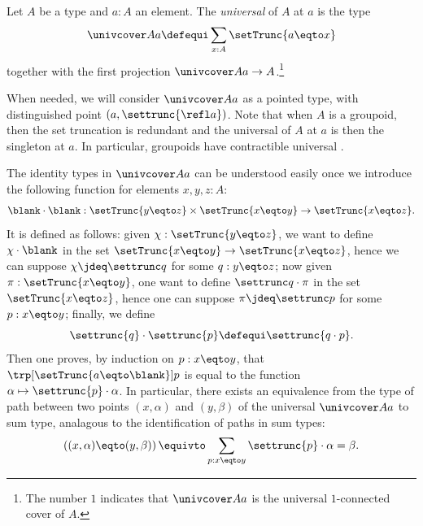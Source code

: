 \begin{definition}
  Let $A$ be a type and $a:A$ an element. The {\em universal \covering} of $A$ at
  $a$ is the type
  \begin{displaymath}
    \univcover A a \defequi \sum_{x:A}\setTrunc{a\eqto x}
  \end{displaymath}
  together with the first projection $\univcover A a \to A$.\footnote{%
    The number $1$ indicates that $\univcover A a$ is the universal
    $1$-connected cover of $A$.}
\end{definition}
When needed, we will consider $\univcover A a$ as a pointed type, with
distinguished point $(a,\settrunc{\refl a})$. Note that when $A$ is a
groupoid, then the set truncation is redundant and the universal \covering
of $A$ at $a$ is then the singleton at $a$. In particular, groupoids
have contractible universal \coverings.

The identity types in $\univcover A a$ can be understood easily once
we introduce the following function for elements $x,y,z:A$:
\begin{displaymath}
  \blank\cdot\blank : \setTrunc{y\eqto z} \times \setTrunc{x\eqto y} \to \setTrunc{x\eqto z}.
\end{displaymath}
It is defined as follows: given $\chi : \setTrunc{y\eqto z}$, we want to define
$\chi\cdot\blank$ in the set $\setTrunc{x\eqto y} \to \setTrunc{x\eqto z}$,
hence we can suppose $\chi\jdeq\settrunc q$ for some $q:y\eqto z$; now given
$\pi:\setTrunc{x\eqto y}$, one want to define $\settrunc q \cdot \pi$ in the set
$\setTrunc{x\eqto z}$, hence one can suppose $\pi\jdeq\settrunc p$ for some
$p:x\eqto y$; finally, we define
\begin{displaymath}
  \settrunc{q} \cdot \settrunc{p} \defequi \settrunc{q\cdot p}.
\end{displaymath}
Then one proves, by induction on $p:x\eqto y$, that
$\trp[\setTrunc{a\eqto\blank}]p$ is equal to the function
$\alpha\mapsto \settrunc{p}\cdot \alpha$. In particular, there exists an
equivalence from the type of path between two points $(x,\alpha)$ and
$(y,\beta)$ of the universal \covering $\univcover A a$ to sum type, analagous to
the identification of paths in sum types:
\begin{equation}
  \label{eq:id-types-universal-cover}%
  \left((x,\alpha) \eqto (y,\beta)\right)
  \equivto \sum_{p:x\eqto y}\settrunc{p} \cdot \alpha = \beta.
\end{equation}

